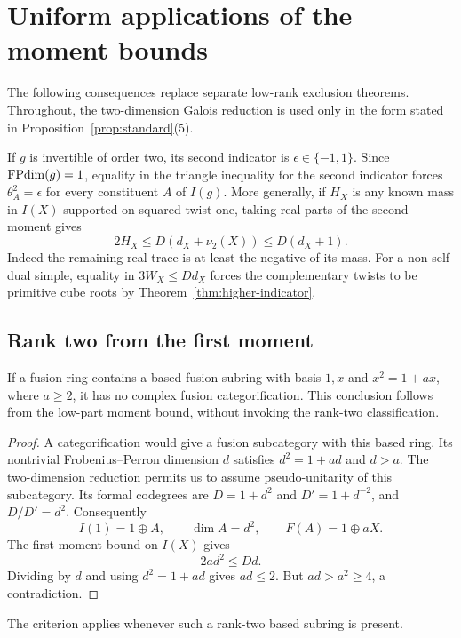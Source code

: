 \section{Uniform applications of the moment bounds}\label{sec:applications}
The following consequences replace separate low-rank exclusion theorems.
Throughout, the two-dimension Galois reduction is used only in the form
stated in Proposition~\ref{prop:standard}(5).

If $g$ is invertible of order two, its second indicator is
$\epsilon\in\{-1,1\}$. Since $\operatorname{FPdim}(g)=1$, equality in the triangle
inequality for the second indicator forces $\theta_A^2=\epsilon$ for
every constituent $A$ of $I(g)$. More generally, if $H_X$ is any known
mass in $I(X)$ supported on squared twist one, taking real parts of the
second moment gives
\begin{equation}\label{eq:square-sector}
 2H_X\leq D(d_X+\nu_2(X))\leq D(d_X+1).
\end{equation}
Indeed the remaining real trace is at least the negative of its mass.
For a non-self-dual simple, equality in
$3W_X\leq Dd_X$ forces the complementary twists to be primitive cube
roots by Theorem~\ref{thm:higher-indicator}.

\subsection{Rank two from the first moment}
\begin{proposition}\label{prop:ranktwo}
If a fusion ring contains a based fusion subring with basis $1,x$ and $x^2=1+ax$, where $a\geq2$, it has no complex fusion categorification. This conclusion follows from the low-part moment bound, without invoking the rank-two classification.
\end{proposition}
\begin{proof}
A categorification would give a fusion subcategory with this based ring. Its nontrivial Frobenius--Perron dimension $d$ satisfies $d^2=1+ad$ and $d>a$. The two-dimension reduction permits us to assume pseudo-unitarity of this subcategory. Its formal codegrees are $D=1+d^2$ and $D'=1+d^{-2}$, and $D/D'=d^2$. Consequently
\[
I(1)=1\oplus A,\qquad \dim A=d^2,\qquad F(A)=1\oplus aX.
\]
The first-moment bound on $I(X)$ gives
\[
2ad^2\leq Dd.
\]
Dividing by $d$ and using $d^2=1+ad$ gives $ad\leq2$. But $ad>a^2\geq4$, a contradiction.
\end{proof}
The criterion applies whenever such a rank-two based subring is present.

